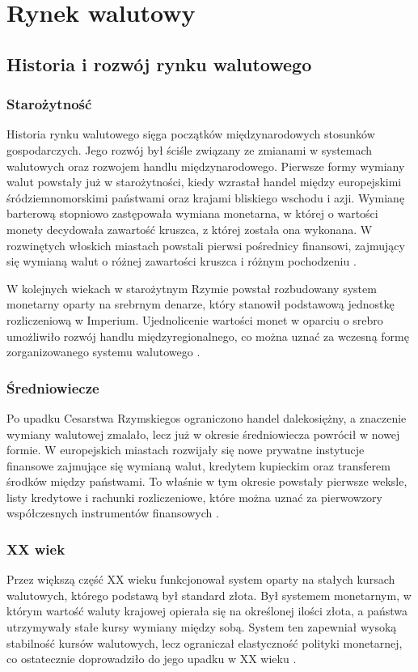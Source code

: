 \chapter{Rynek walutowy}

\section{Historia i rozwój rynku walutowego}
\subsection{Starożytność}
Historia rynku walutowego sięga początków międzynarodowych stosunków gospodarczych. Jego rozwój był ściśle związany ze zmianami w systemach walutowych oraz rozwojem handlu międzynarodowego. 
Pierwsze formy wymiany walut powstały już w starożytności, kiedy wzrastał handel między europejskimi śródziemnomorskimi państwami oraz krajami bliskiego wschodu i azji. 
Wymianę barterową stopniowo zastępowała wymiana monetarna, w której o wartości monety decydowała zawartość kruszca, z której została ona wykonana. 
W rozwinętych włoskich miastach powstali pierwsi pośrednicy finansowi, zajmujący się wymianą walut o różnej zawartości kruszca i różnym pochodzeniu \parencite{melvin2013}. 

W kolejnych wiekach w starożytnym Rzymie powstał rozbudowany system monetarny oparty na srebrnym denarze, który stanowił podstawową jednostkę rozliczeniową w Imperium. 
Ujednolicenie wartości monet w oparciu o srebro umożliwiło rozwój handlu międzyregionalnego, co można uznać za wczesną formę zorganizowanego systemu walutowego \parencite{melvin2013}. 

\subsection{Średniowiecze}
Po upadku Cesarstwa Rzymskiegos ograniczono handel dalekosiężny, a znaczenie wymiany walutowej zmalało, lecz już w okresie średniowiecza powrócił w nowej formie. 
W europejskich miastach rozwijały się nowe prywatne instytucje finansowe zajmujące się wymianą walut, kredytem kupieckim oraz transferem środków między państwami. 
To właśnie w tym okresie powstały pierwsze weksle, listy kredytowe i rachunki rozliczeniowe, które można uznać za pierwowzory współczesnych instrumentów finansowych \parencite{mishkin2018}.

\subsection{XX wiek}
Przez większą część XX wieku funkcjonował system oparty na stałych kursach walutowych, którego podstawą był standard złota. 
Był systemem monetarnym, w którym wartość waluty krajowej opierała się na określonej ilości złota, a państwa utrzymywały stałe kursy wymiany między sobą. 
System ten zapewniał wysoką stabilność kursów walutowych, lecz ograniczał elastyczność polityki monetarnej, co ostatecznie doprowadziło do jego upadku w XX wieku \parencite{mishkin2018}.


